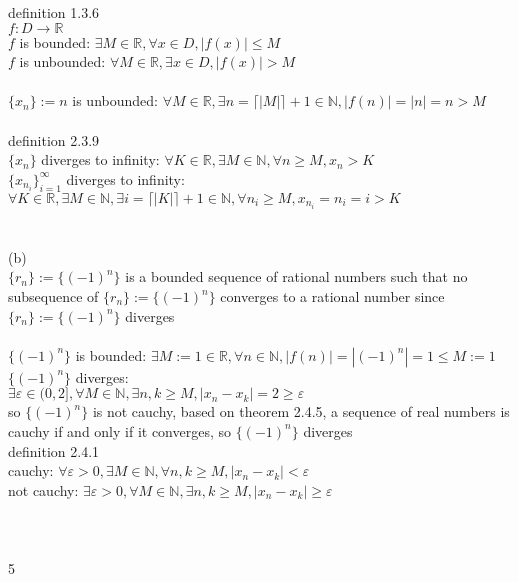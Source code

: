 \documentclass[12pt, border = 4pt, multi]{article} %
\begin{document}
definition 1.3.6\\
$f: D \rightarrow \mathbb{R}$\\
$f$ is bounded: $\exists M \in \mathbb{R}, \forall x \in D, |f(x)| \leq M$\\
$f$ is unbounded: $\forall M \in \mathbb{R}, \exists x \in D, |f(x)| > M$\\
\\
$\{x_n\} := n$ is unbounded: $\forall M \in \mathbb{R}, \exists n = \lceil|M|\rceil + 1 \in \mathbb{N}, |f(n)| = |n| = n > M$\\
\\
definition 2.3.9\\
$\{x_n\}$ diverges to infinity: $\forall K \in \mathbb{R}, \exists M \in \mathbb{N}, \forall n \geq M, x_n > K$\\
$\{x_{n_i}\}_{i = 1} ^ {\infty}$ diverges to infinity: $\forall K \in \mathbb{R}, \exists M \in \mathbb{N}, \exists i = \lceil|K|\rceil + 1 \in \mathbb{N}, \forall n_i \geq M, x_{n_i} = n_i = i > K$\\
\\
\\
(b)\\
$\{r_n\} := \{(-1) ^ n\}$ is a bounded sequence of rational numbers such that no subsequence of $\{r_n\} := \{(-1) ^ n\}$ converges to a rational number since $\{r_n\} := \{(-1) ^ n\}$ diverges\\
\\
$\{(-1) ^ n\}$ is bounded: $\exists M := 1 \in \mathbb{R}, \forall n \in \mathbb{N}, |f(n)| = |(-1) ^ n| = 1 \leq M := 1$\\
$\{(-1) ^ n\}$ diverges:\\
$\exists \varepsilon \in (0, 2], \forall M \in \mathbb{N}, \exists n, k \geq M, |x_n - x_k| = 2 \geq \varepsilon$\\
so $\{(-1) ^ n\}$ is not cauchy, based on theorem 2.4.5, a sequence of real numbers is cauchy if and only if it converges, so $\{(-1) ^ n\}$ diverges\\
definition 2.4.1\\
cauchy: $\forall \varepsilon > 0, \exists M \in \mathbb{N}, \forall n, k \geq M, |x_n - x_k| < \varepsilon$\\
not cauchy: $\exists \varepsilon > 0, \forall M \in \mathbb{N}, \exists n, k \geq M, |x_n - x_k| \geq \varepsilon$\\
\\
\\
\\
5\\
\end{document}

